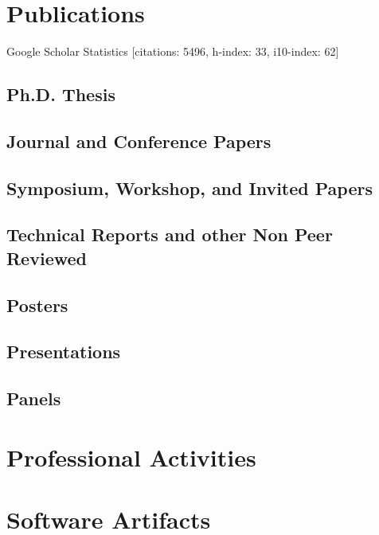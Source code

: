 \documentclass{article}
\begin{document}
\section*{Publications}

Google Scholar Statistics [citations: 5496, h-index: 33, i10-index: 62]

\subsection*{Ph.D. Thesis}


\subsection*{Journal and Conference Papers}


\subsection*{Symposium, Workshop, and Invited Papers}


\subsection*{Technical Reports and other Non Peer Reviewed}


\subsection*{Posters}



\subsection*{Presentations}



\subsection*{Panels}



\section*{Professional Activities}


\section*{Software Artifacts}
\end{document}
